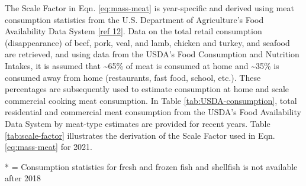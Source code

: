 \documentclass[
  11pt,
  oneside]{book}
\begin{document}
The Scale Factor in Eqn. \eqref{eq:mass-meat} is year-specific and derived using meat consumption statistics from the U.S. Department of Agriculture's Food Availability Data System \hyperref[cooking-references]{{[}ref 12{]}}. Data on the total retail consumption (disappearance) of beef, pork, veal, and lamb, chicken and turkey, and seafood are retrieved, and using data from the USDA's Food Consumption and Nutrition Intakes, it is assumed that \textasciitilde65\% of meat is consumed at home and \textasciitilde35\% is consumed away from home (restaurants, fast food, school, etc.). These percentages are subsequently used to estimate consumption at home and scale commercial cooking meat consumption. In Table \ref{tab:USDA-consumption}, total residential and commercial meat consumption from the USDA's Food Availability Data System by meat-type estimates are provided for recent years. Table \ref{tab:scale-factor} illustrates the derivation of the Scale Factor used in Eqn. \eqref{eq:mass-meat} for 2021.

\begin{table}[H]
\centering
\caption{\label{tab:USDA-consumption}Total Retail Consumption from USDA Food Availability Data System}
\centering
{}
\end{table}

\noindent
* = Consumption statistics for fresh and frozen fish and shellfish is not available after 2018
\end{document}
